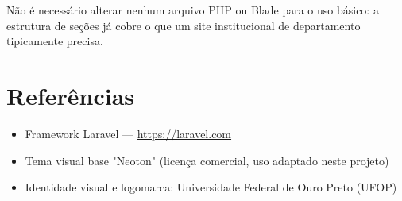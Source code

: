 \documentclass[11pt,a4paper]{article}
\begin{document}
Não é necessário alterar nenhum arquivo PHP ou Blade para o uso básico: a estrutura de seções já
cobre o que um site institucional de departamento tipicamente precisa.

\section{Referências}

\begin{itemize}[leftmargin=2em]
    \item Framework Laravel — \url{https://laravel.com}
    \item Tema visual base "Neoton" (licença comercial, uso adaptado neste projeto)
    \item Identidade visual e logomarca: Universidade Federal de Ouro Preto (UFOP)
\end{itemize}
\end{document}
